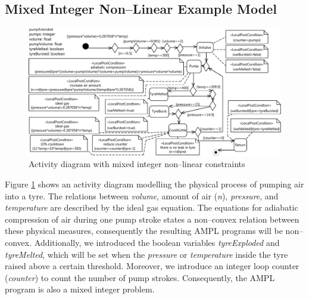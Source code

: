 \documentclass[runningheads,a4paper]{llncs}%
\newcommand{\OCLVar}[1]{\textit{#1}}
\begin{document}
\subsection{Mixed Integer Non--Linear Example Model}
\label{sec:exampleModelNonConvex}
\begin{figure}
\includegraphics[width=\textwidth]{pics/pumpTyre.pdf}
\caption{Activity diagram with mixed integer non--linear constraints}
\label{fig:pumpTyre}
\end{figure}
Figure \ref{fig:pumpTyre} shows an activity diagram modelling the physical
process of pumping air into a tyre. The relations between \OCLVar{volume},
amount of air (\OCLVar{n}), \OCLVar{pressure}, and \OCLVar{temperature} are
described by the ideal gas equation. The equations for adiabatic compression of
air during one pump stroke states a non--convex relation between these physical
measures, consequently the resulting AMPL programs will be non--convex.
Additionally, we introduced the boolean variables \OCLVar{tyreExploded} and
\OCLVar{tyreMelted}, which will be set when the \OCLVar{pressure} or
\OCLVar{temperature} inside the tyre raised above a certain threshold. Moreover,
we introduce an integer loop counter (\OCLVar{counter}) to count the number of
pump strokes. Consequently, the AMPL program is also a mixed integer problem.
%
\end{document}
